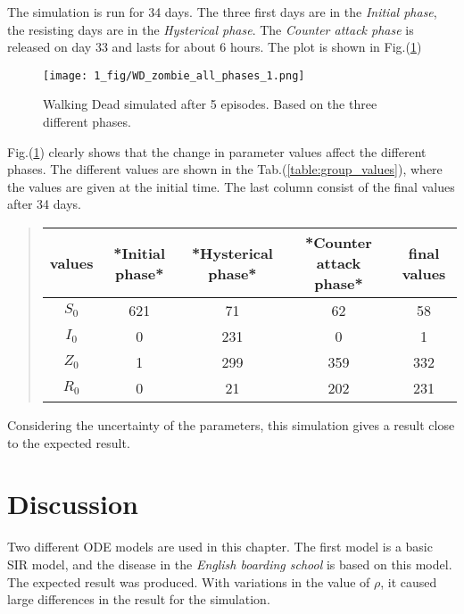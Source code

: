 \documentclass[%
twoside,                 %
final,                   %
chapterprefix=true,      %
open=right               %
10pt]{book}
\begin{document}
\noindent
The simulation is run for 34 days. The three first days are in the \emph{Initial phase}, the resisting days are in the \emph{Hysterical phase}. The \emph{Counter attack phase} is released on day 33 and lasts for about 6 hours. The plot is shown in Fig.(\ref{fig:all_phases})   


\begin{figure}[ht]
  \centerline{\texttt{[image: 1\_fig/WD\_zombie\_all\_phases\_1.png]}}
  \caption{
  \label{fig:all_phases} Walking Dead simulated after 5 episodes. Based on the three different phases.
  }
\end{figure}


Fig.(\ref{fig:all_phases}) clearly shows that the change in parameter values affect the different phases. The different values are shown in the Tab.(\ref{table:group_values}), where the values are given at the initial time. The last column consist of the final values after 34 days.

\label{table:group_values}

\begin{quote}
\begin{tabular}{ccccc}
\hline
\multicolumn{1}{c}{ values } & \multicolumn{1}{c}{ *Initial phase* } & \multicolumn{1}{c}{ *Hysterical phase* } & \multicolumn{1}{c}{ *Counter attack phase* } & \multicolumn{1}{c}{ final values } \\
\hline
$S_0$  & 621             & 71                 & 62                     & 58           \\
$I_0$  & 0               & 231                & 0                      & 1            \\
$Z_0$  & 1               & 299                & 359                    & 332          \\
$R_0$  & 0               & 21                 & 202                    & 231          \\
\hline
\end{tabular}
\end{quote}

\noindent
Considering the uncertainty of the parameters, this simulation gives a result close to the expected result. 


\vspace{3mm}




\vspace{3mm}



\section{Discussion}
Two different ODE models are used in this chapter. The first model is a basic SIR model, and the disease in the \emph{English boarding school} is based on this model. The expected result was produced. With variations in the value of $\rho$, it caused large differences in the result for the simulation.
\end{document}
